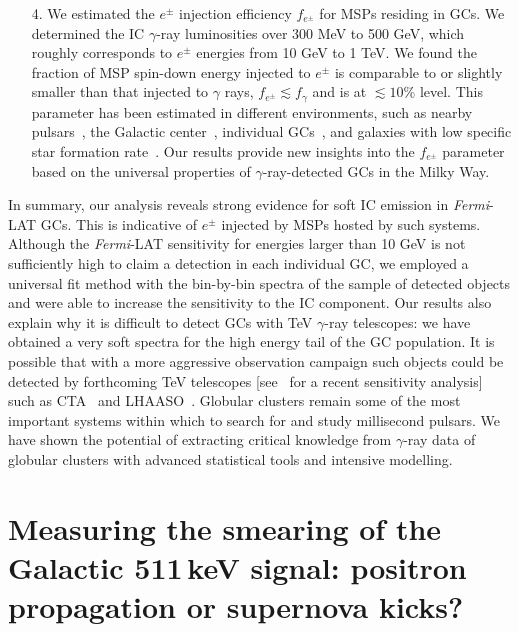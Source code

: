 \documentclass[doublespace,draft,nopageskip]{VTthesis} %
\begin{document}
\begin{itemize}
    \item[4.] We estimated the $e^\pm$ injection efficiency $f_{e^\pm}$ for MSPs residing in GCs. We determined the IC $\gamma$-ray luminosities over 300 MeV to 500 GeV, which roughly corresponds to $e^\pm$ energies from 10 GeV to 1 TeV. We found the fraction of MSP spin-down energy injected to $e^\pm$ is comparable to or slightly smaller than that injected to $\gamma$ rays, $f_{e^\pm} \lesssim f_\gamma$ and is at $\lesssim 10\%$ level. This parameter has been estimated in different environments, such as {nearby pulsars~\citep{2017PhRvD..96j3013H, 2018PhRvD..98d3005H, 2021arXiv210400014H}}, the Galactic center~\citep{2013MNRAS.435L..14B}, individual GCs~\citep{2019MNRAS.484.2876M}, and galaxies with low specific star formation rate~\citep{2020arXiv200508982S}. Our results provide new insights into the $f_{e^\pm}$ parameter based on the universal properties of $\gamma$-ray-detected GCs in the Milky Way.
\end{itemize}

In summary, our analysis reveals strong evidence for {soft} IC emission in \textit{Fermi}-LAT GCs. This is indicative of $e^\pm$ injected by MSPs hosted by such systems. Although the {\it Fermi}-LAT sensitivity for energies larger than 10 GeV is not sufficiently high to claim a detection in each individual GC, we employed a universal fit method with the bin-by-bin spectra of the sample of detected objects and were able to increase the sensitivity to the IC component. Our results also explain why it is difficult to detect GCs with TeV $\gamma$-ray telescopes: we have obtained a very soft spectra for the high energy tail of the GC population. It is possible that with a more aggressive observation campaign such objects could be detected by forthcoming TeV telescopes [see~\citep{2018MNRAS.473..897N} for a recent sensitivity analysis] such as CTA~\citep{2019scta.book.....C} and LHAASO~\citep{2019arXiv190502773B}. Globular clusters remain some of the most important systems within which to search for and study millisecond pulsars. We have shown the potential of extracting critical knowledge from $\gamma$-ray data of globular clusters with advanced statistical tools and intensive modelling. 

\chapter{Measuring the smearing of the Galactic 511\,keV signal: positron propagation or supernova kicks?} \label{ch:511keV}
\end{document}
